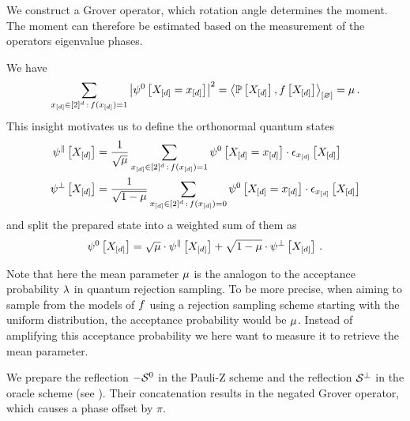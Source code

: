 We construct a Grover operator, which rotation angle determines the moment.
The moment can therefore be estimated based on the measurement of the operators eigenvalue phases.

We have
\begin{align*}
    \sum_{x_{[d]}\in[2]^{d} \,:\, f(x_{[d]})=1}
    \left|\psi^{0}\left[X_{[d]}=x_{[d]}\right]\right|^2
    = \left\langle \mathbb{P}\left[X_{[d]}\right],f\left[X_{[d]}\right]\right\rangle_{\left[ \varnothing \right]}  = \mu \, .
\end{align*}
This insight motivates us to define the orthonormal quantum states
\begin{align*}
    \psi^{\parallel}\left[X_{[d]}\right]
    &= \frac{1}{\sqrt{\mu}} \sum_{x_{[d]}\in[2]^{d} \,:\, f(x_{[d]})=1}
    \psi^{0}\left[X_{[d]}=x_{[d]}\right] \cdot \epsilon_{x_{[d]}}\left[X_{[d]}\right] \\
    \psi^{\perp}\left[X_{[d]}\right]
    &= \frac{1}{\sqrt{1-\mu}} \sum_{x_{[d]}\in[2]^{d} \,:\, f(x_{[d]})=0}
    \psi^{0}\left[X_{[d]}=x_{[d]}\right] \cdot \epsilon_{x_{[d]}}\left[X_{[d]}\right]
\end{align*}
and split the prepared state into a weighted sum of them as
\begin{align*}
    \psi^{0}\left[X_{[d]}\right]
    = \sqrt{\mu} \cdot \psi^{\parallel}\left[X_{[d]}\right]
    + \sqrt{1-\mu} \cdot \psi^{\perp}\left[X_{[d]}\right] \, .
\end{align*}

Note that here the mean parameter $\mu$ is the analogon to the acceptance probability $\lambda$ in quantum rejection sampling.
To be more precise, when aiming to sample from the models of $f$ using a rejection sampling scheme starting with the uniform distribution, the acceptance probability would be $\mu$.
Instead of amplifying this acceptance probability we here want to measure it to retrieve the mean parameter.

We prepare the reflection $-\mathcal{S}^{0}$ in the Pauli-Z scheme and the reflection $\mathcal{S}^{\perp}$ in the oracle scheme (see ).
Their concatenation results in the negated Grover operator, which causes a phase offset by $\pi$.



